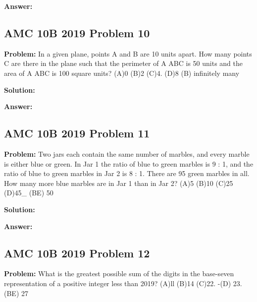 \documentclass{article}
\newenvironment{problem}{\textbf{Problem: }}{\\}
\newenvironment{solution}{\textbf{Solution: }}{\\}
\newenvironment{answer}{\textbf{Answer: }}{\\}
\begin{document}
\begin{answer}
\end{answer}

\subsection{AMC 10B 2019 Problem 10}

\begin{problem}
In a given plane, points A and B are 10 units apart. How many points C are there in the plane such that the perimeter of A ABC is 50 units and the area of A ABC is 100 square units? (A)0 (B)2 (C)4. (D)8 (B) infinitely many
\end{problem}

\begin{solution}
\end{solution}

\begin{answer}
\end{answer}

\subsection{AMC 10B 2019 Problem 11}

\begin{problem}
Two jars each contain the same number of marbles, and every marble is either blue or green. In Jar 1 the ratio of blue to green marbles is 9 : 1, and the ratio of blue to green marbles in Jar 2 is 8 : 1. There are 95 green marbles in all. How many more blue marbles are in Jar 1 than in Jar 2? (A)5 (B)10 (C)25 (D)45_ (BE) 50
\end{problem}

\begin{solution}
\end{solution}

\begin{answer}
\end{answer}

\subsection{AMC 10B 2019 Problem 12}

\begin{problem}
What is the greatest possible sum of the digits in the base-seven representation of a positive integer less than 2019? (A)ll (B)14 (C)22. -(D) 23. (BE) 27
\end{problem}
\end{document}

